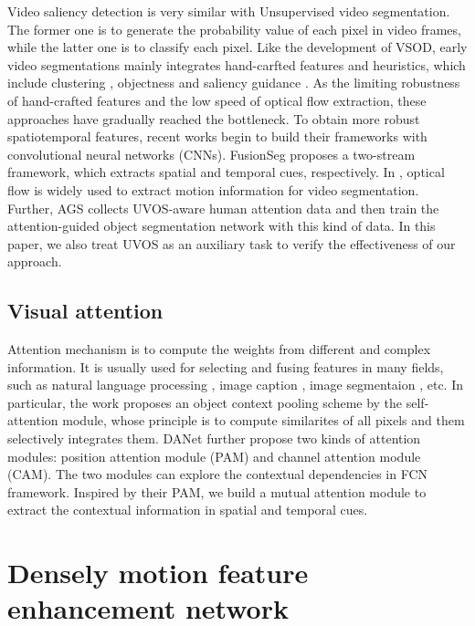 \documentclass[12pt]{article}
\begin{document}
Video saliency detection is very similar with Unsupervised video segmentation. The former one is to generate the probability value of each pixel in video frames, while the latter one is to classify each pixel. Like the development of VSOD, early video segmentations mainly integrates hand-carfted features and heuristics, which include clustering \cite{keuper2015motion,brox2010object,chang2013video}, objectness \cite{lee2011key,ma2012maximum,koh2017primary,li2018instance} and saliency guidance \cite{hu2018unsupervised,wang2015consistent,wang2015robust}. As the limiting robustness of hand-crafted features and the low speed of optical flow extraction, these approaches have gradually reached the bottleneck. To obtain more robust spatiotemporal features, recent works begin to build their frameworks with convolutional neural networks (CNNs). FusionSeg \cite{jain2017fusionseg} proposes a two-stream framework, which extracts spatial and temporal cues, respectively. In \cite{perazzi2017learning,Tokmakov_2017_CVPR,Cheng_2017_ICCV}, optical flow is widely used to extract motion information for video segmentation. Further, AGS \cite{AGS} collects UVOS-aware human attention data and then train the attention-guided object segmentation network with this kind of data. In this paper, we also treat UVOS as an auxiliary task to verify the effectiveness of our approach.  

\subsection{Visual attention}

Attention mechanism is to compute the weights from different and complex information. It is usually used for selecting and fusing features in many fields, such as natural language processing \cite{lin2017structured, vaswani2017attention}, image caption \cite{chen2017sca,lu2016hierarchical}, image segmentaion \cite{fu2019dual,yuan2018ocnet}, etc. In particular, the work \cite{yuan2018ocnet} proposes an object context pooling scheme by the self-attention module, whose principle is to compute similarites of all pixels and them selectively integrates them. DANet \cite{fu2019dual} further propose two kinds of attention modules: position attention module (PAM) and channel attention module (CAM). The two modules can explore the contextual dependencies in FCN framework. Inspired by their PAM, we build a mutual attention module to extract the contextual information in spatial and temporal cues. 

\section{Densely motion feature enhancement network}
\end{document}
